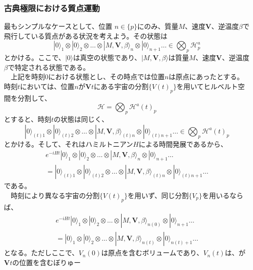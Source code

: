 \subsubsection{古典極限における質点運動}
最もシンプルなケースとして、位置 $n \in \{p\}$にのみ、質量$M$、速度$\mathbf{V}$、逆温度$\beta$で飛行している質点がある状況を考えよう。その状態は
\begin{equation}
    |0\rangle_1 \otimes |0\rangle_2 \otimes \ldots \otimes |M,\mathbf{V},\beta \rangle_n \otimes |0\rangle_{n+1} \ldots \in \bigotimes_p \mathcal{H}_p^a
\end{equation}
とかける。ここで、$|0\rangle$は真空の状態であり、$|M,\mathbf{V},\beta \rangle$は質量$M$、速度$\mathbf{V}$、逆温度$\beta$で特定される状態である。\\
　上記を時刻$0$における状態とし、その時点では位置$n$は原点にあったとする。時刻$t$においては、位置$n$が$\mathbf{V}t$にある宇宙の分割$\{V(t)_p\}$を用いてヒルベルト空間を分割して、
\begin{equation}
    \mathcal{H} = \bigotimes_p \mathcal{H}^a(t)_p
\end{equation}
とすると、時刻$t$の状態は同じく、
\begin{equation}
    |0\rangle_{(t)1} \otimes |0\rangle_{(t)2} \otimes \ldots \otimes |M,\mathbf{V},\beta \rangle_{(t)n} \otimes |0\rangle_{(t)n+1} \ldots \in \bigotimes_p \mathcal{H}^a(t)_p
\end{equation}
とかける。そして、それはハミルトニアン$H$による時間発展であるから、
\begin{equation}
\begin{aligned}
    e^{-iHt}|0\rangle_1 \otimes |0\rangle_2 \otimes \ldots \otimes |M,\mathbf{V},\beta \rangle_n \otimes |0\rangle_{n+1} \ldots \\
    =  |0\rangle_{(t)1} \otimes |0\rangle_{(t)2} \otimes \ldots \otimes |M,\mathbf{V},\beta \rangle_{(t)n} \otimes |0\rangle_{(t)n+1} \ldots
\end{aligned}
\end{equation}
である。\\
　時刻により異なる宇宙の分割$\{V(t)_p\}$を用いず、同じ分割$\{V_p\}$を用いるならば、
\begin{equation}
\begin{aligned}
    e^{-iHt}|0\rangle_1 \otimes |0\rangle_2 \otimes \ldots \otimes |M,\mathbf{V},\beta \rangle_{n(0)} \otimes |0\rangle_{n+1} \ldots \\
    =  |0\rangle_{1} \otimes |0\rangle_{2} \otimes \ldots \otimes |M,\mathbf{V},\beta \rangle_{n(t)} \otimes |0\rangle_{n(t)+1} \ldots
\end{aligned}
\end{equation}
となる。ただしここで、$V_n(0)$は原点を含むボリュームであり、$V_n(t)$は、が$\mathbf{V}t$の位置を含むぼりゅー